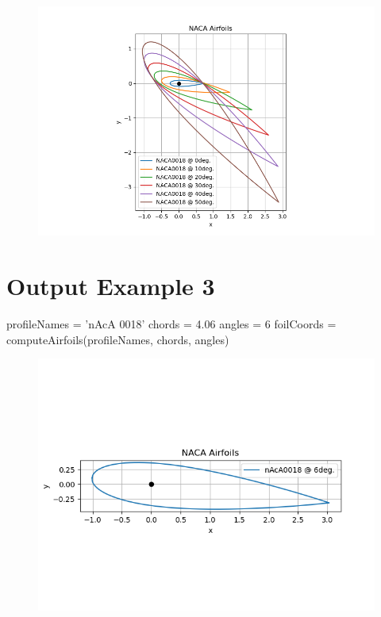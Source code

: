 \documentclass{article}
\begin{document}
\begin{figure}[h]
    \centering
    \includegraphics[width=\textwidth]{exOutput2.png}
\end{figure}

\newpage

\section*{Output Example 3}

\begin{python}
    profileNames = 'nAcA      0018'
    chords = 4.06
    angles = 6
    foilCoords = computeAirfoils(profileNames, chords, angles)
\end{python}

\begin{figure}[h]
    \centering
    \includegraphics[width=\textwidth]{exOutput3.png}
\end{figure}
\end{document}
